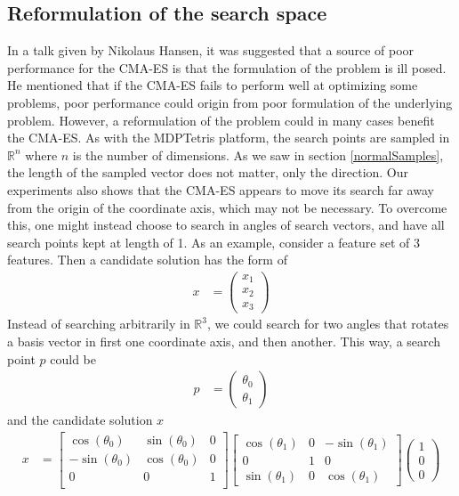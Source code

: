 \subsection{Reformulation of the search space}

In a talk given by Nikolaus Hansen, it was suggested that a source of poor performance 
for the CMA-ES is that the formulation of the problem is ill posed.
He mentioned that if the CMA-ES fails to perform well at optimizing some problems, poor 
performance could origin from poor formulation of the underlying problem. 
However, a reformulation of the problem could in many cases benefit the CMA-ES. As with the 
MDPTetris platform, the search points are sampled in $\mathbb{R}^n$ where 
$n$ is the number of dimensions. As we saw in section \ref{normalSamples}, the length 
of the sampled vector does not matter, only the direction. Our experiments also shows that 
the CMA-ES appears to move its search far away from the origin of the coordinate axis,
which may not be necessary. To overcome this, one might instead choose to search in angles 
of search vectors, and have all search points kept at length of 1. As an example, 
consider a feature set of 3 features. Then a candidate solution has the form of
\begin{align}
x &= \begin{pmatrix}
x_1 \\
x_2 \\
x_3
\end{pmatrix}
\end{align}
Instead of searching arbitrarily in $\mathbb{R}^3$, we could search for two angles that rotates
a basis vector in first one coordinate axis, and then another. This way, a search point $p$ 
could be
\begin{align}
p &= \begin{pmatrix}
\theta_0\\
\theta_1
\end{pmatrix}
\end{align}
and the candidate solution $x$
\begin{align}
x &= 
\begin{bmatrix}
\cos\left( \theta_0 \right) & \sin\left( \theta_0 \right) & 0\\
-\sin\left( \theta_0 \right) & \cos\left( \theta_0 \right) & 0\\
0 & 0 & 1\\
\end{bmatrix}
\begin{bmatrix}
\cos\left( \theta_1 \right) & 0 & -\sin\left( \theta_1 \right)\\
0 & 1 & 0\\
\sin\left( \theta_1 \right) & 0 & \cos\left( \theta_1 \right)
\end{bmatrix}
\begin{pmatrix}
1\\
0\\
0
\end{pmatrix}
\end{align}
